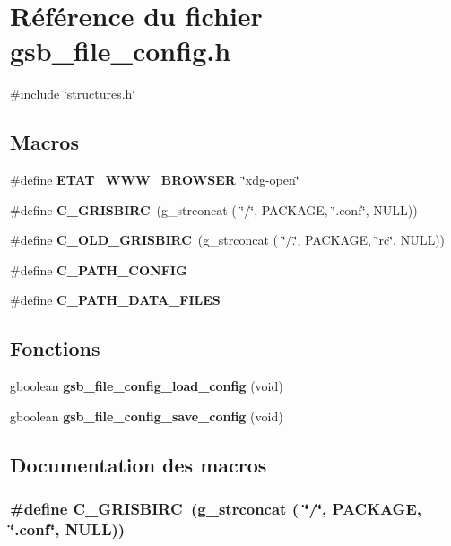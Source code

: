 \section{Référence du fichier gsb\_\-file\_\-config.h}
\label{gsb__file__config_8h}
{\ttfamily \#include \char`\"{}structures.h\char`\"{}}\par
\subsection*{Macros}
\begin{DoxyCompactItemize}
\item 
\#define {\bf ETAT\_\-WWW\_\-BROWSER}~\char`\"{}xdg-\/open\char`\"{}
\item 
\#define {\bf C\_\-GRISBIRC}~(g\_\-strconcat ( \char`\"{}/\char`\"{}, PACKAGE, \char`\"{}.conf\char`\"{}, NULL))
\item 
\#define {\bf C\_\-OLD\_\-GRISBIRC}~(g\_\-strconcat ( \char`\"{}/.\char`\"{}, PACKAGE, \char`\"{}rc\char`\"{}, NULL))
\item 
\#define {\bf C\_\-PATH\_\-CONFIG}
\item 
\#define {\bf C\_\-PATH\_\-DATA\_\-FILES}
\end{DoxyCompactItemize}
\subsection*{Fonctions}
\begin{DoxyCompactItemize}
\item 
gboolean {\bf gsb\_\-file\_\-config\_\-load\_\-config} (void)
\item 
gboolean {\bf gsb\_\-file\_\-config\_\-save\_\-config} (void)
\end{DoxyCompactItemize}


\subsection{Documentation des macros}
\subsubsection[{C\_\-GRISBIRC}]{\setlength{\rightskip}{0pt plus 5cm}\#define C\_\-GRISBIRC~(g\_\-strconcat ( \char`\"{}/\char`\"{}, PACKAGE, \char`\"{}.conf\char`\"{}, NULL))}\label{gsb__file__config_8h_aa4425d80cedbaa4d9d467eb83be930c9}


